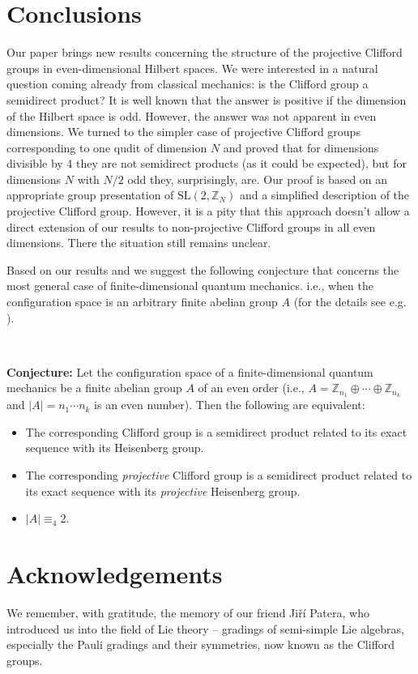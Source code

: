 \documentclass[10pt]{amsart}
\theoremstyle{plain}
\theoremstyle{definition}
\theoremstyle{remark}%
\newcommand{\Z}{\mathbb{Z}}
\newcommand{\SL}{\mathrm{SL}}
\begin{document}
\section{Conclusions}\label{conclusion}


Our paper brings new results concerning the structure of the projective
Clifford groups in even-dimensional Hilbert spaces.
We were interested in a natural question coming already from classical mechanics:
is the Clifford group a semidirect product?
It is well known that the answer is positive if the dimension of the Hilbert space is odd.
However, the answer was not apparent in even dimensions. 
We turned to the simpler case of projective Clifford groups corresponding to one qudit of dimension $N$
 and proved  that for dimensions divisible by 4 
they are not semidirect products (as it could be expected), but for dimensions $N$ with $N/2$ odd they, surprisingly, are. 
Our proof is  based on an appropriate group presentation of $\SL(2,\Z_N)$ and a simplified description of the projective Clifford group.
However, it is a pity that this approach doesn't allow a direct extension of our results
to non-projective Clifford groups in all even dimensions.
There the situation still remains unclear. 

Based on our results and \cite{bolt1,bolt2} we suggest the following conjecture that concerns the most general case of finite-dimensional quantum mechanics. i.e., when the configuration space is an arbitrary finite abelian group  $A$ (for the details see e.g. \cite{KorbTolar12}).

\

\textbf{Conjecture:} Let the configuration space of a finite-dimensional quantum mechanics be a finite abelian group  $A$ of an even order (i.e., $A=\Z_{n_1}\oplus\cdots\oplus\Z_{n_k}$ and $|A|=n_1\cdots n_k$ is an even number). Then the following are equivalent:
\begin{itemize}
 \item The corresponding Clifford group is a  semidirect product related to its exact sequence with its Heisenberg group.  
 \item The corresponding \emph{projective} Clifford group is a  semidirect product related to its exact sequence with its \emph{projective} Heisenberg group.
 \item $|A|\equiv_{4} 2$.
\end{itemize}





\section*{Acknowledgements}
We remember, with gratitude, the memory of our friend
Ji\v{r}\'{i} Patera, who introduced us into the field of Lie theory --
gradings of semi-simple Lie algebras, especially the Pauli gradings
and their symmetries, now known as the Clifford groups.
\end{document}

